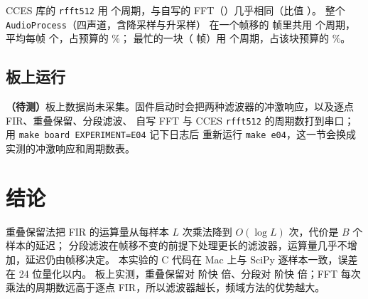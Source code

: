 \documentclass[zihao=-4, linespread=1.5, fontset=none]{ctexart}
\begin{document}
CCES 库的 \texttt{rfft512} 用 \LibFftCycles{} 个周期，与自写的 FFT（\FftCycles）几乎相同（比值 \LibFftRatio）。
整个 \texttt{AudioProcess}（四声道，含降采样与升采样）
在一个帧移的 \AudioFrames{} 帧里共用 \AudioCycles{} 个周期，平均每帧 \AudioPerFrame{} 个，占预算的 \AudioLoad\%；
最忙的一块（\PeakFrames{} 帧）用 \PeakCycles{} 个周期，占该块预算的 \PeakLoad\%。
\else
\subsection{板上运行}

\textbf{（待测）}板上数据尚未采集。固件启动时会把两种滤波器的冲激响应，以及逐点 FIR、重叠保留、分段滤波、
自写 FFT 与 CCES \texttt{rfft512} 的周期数打到串口；用 \texttt{make board EXPERIMENT=E04} 记下日志后
重新运行 \texttt{make e04}，这一节会换成实测的冲激响应和周期数表。
\fi

\section{结论}

重叠保留法把 FIR 的运算量从每样本 $L$ 次乘法降到 $O(\log L)$ 次，代价是 $B$ 个样本的延迟；
分段滤波在帧移不变的前提下处理更长的滤波器，运算量几乎不增加，延迟仍由帧移决定。
本实验的 C 代码在 Mac 上与 SciPy 逐样本一致，误差在 24 位量化以内。
\ifdefined\BoardRun 板上实测，重叠保留对 \ShortOrder{} 阶快 \ShortSpeedup{} 倍、分段对 \LongOrder{} 阶快 \LongSpeedup{} 倍；FFT 每次乘法的周期数远高于逐点 FIR，所以滤波器越长，频域方法的优势越大。\fi
\end{document}
